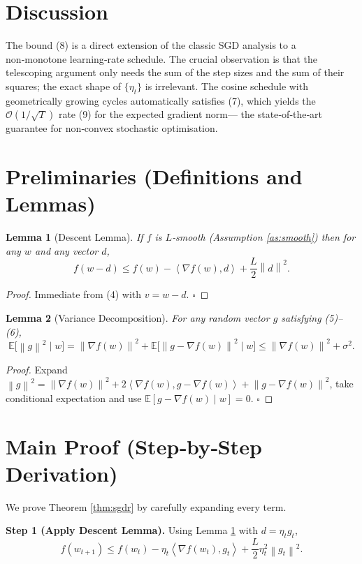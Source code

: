 \documentclass{article}
\newtheorem{lemma}{Lemma}
\newcommand{\E}{\mathbb{E}}
\newcommand{\norm}[1]{\left\lVert#1\right\rVert}
\newcommand{\ip}[2]{\left\langle #1,#2\right\rangle}
\begin{document}
\section*{Discussion}
The bound (8) is a direct extension of the classic SGD analysis to a
non‑monotone learning‑rate schedule. The crucial observation is that the
telescoping argument only needs the sum of the step sizes and the sum of their
squares; the exact shape of $\{\eta_{t}\}$ is irrelevant. The cosine schedule
with geometrically growing cycles automatically satisfies (7), which yields the
$\mathcal{O}(1/\sqrt{T})$ rate (9) for the expected gradient norm— the
state‑of‑the‑art guarantee for non‑convex stochastic optimisation.

\newpage
\section*{Preliminaries (Definitions and Lemmas)}
\begin{lemma}[Descent Lemma]\label{lem:descent}
If $f$ is $L$‑smooth (Assumption \ref{as:smooth}) then for any $w$ and any
vector $d$,
\[
f(w-d)\le f(w)-\ip{\nabla f(w)}{d}+\frac{L}{2}\norm{d}^{2}.        \tag{10}
\]
\end{lemma}
\begin{proof}
Immediate from (4) with $v=w-d$. \hfill $\square$
\end{proof}

\begin{lemma}[Variance Decomposition]\label{lem:variance}
For any random vector $g$ satisfying (5)–(6),
\[
\E\!\bigl[\norm{g}^{2}\mid w\bigr]
    =\norm{\nabla f(w)}^{2}+\E\!\bigl[\norm{g-\nabla f(w)}^{2}\mid w\bigr]
    \le \norm{\nabla f(w)}^{2}+\sigma^{2}.                           \tag{11}
\]
\end{lemma}
\begin{proof}
Expand $\norm{g}^{2}=\norm{\nabla f(w)}^{2}+2\ip{\nabla f(w)}{g-\nabla f(w)}
      +\norm{g-\nabla f(w)}^{2}$, take conditional expectation and use
      $\E[g-\nabla f(w)\mid w]=0$. \hfill $\square$
\end{proof}

\section*{Main Proof (Step‑by‑Step Derivation)}
We prove Theorem \ref{thm:sgdr} by carefully expanding every term.

\noindent\textbf{Step 1 (Apply Descent Lemma).}  
Using Lemma \ref{lem:descent} with $d=\eta_{t}g_{t}$,
\[
f(w_{t+1})\le f(w_{t})-\eta_{t}\ip{\nabla f(w_{t})}{g_{t}}
               +\frac{L}{2}\eta_{t}^{2}\norm{g_{t}}^{2}.                \tag{12}
\]
\end{document}
